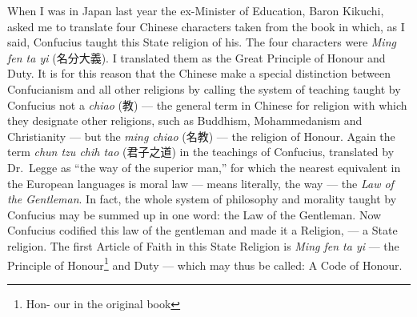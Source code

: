 When I was in Japan last year the ex-Minister of Education, Baron Kikuchi,  asked me to translate four Chinese characters taken from the book in which, as I said, Confucius taught this State religion of his.
The four characters were \emph{Ming fen ta yi} (名分大義).
I translated them as the Great Principle of Honour and Duty.
It is for this reason that the Chinese make a special distinction between Confucianism and all other religions by calling the system of teaching taught by Confucius not a \emph{chiao} (教) --- the general term in Chinese for religion with which they designate other religions, such as Buddhism, Mohammedanism and Christianity --- but the \emph{ming chiao} (名教)  --- the religion of Honour.
Again the term \emph{chun tzu chih tao} (君子之道) in the teachings of Confucius, translated by Dr.~Legge as ``the way of the superior man,'' for which the nearest equivalent in the European languages is moral law --- means literally, the way --- the {\em{Law of the Gentleman}}.
In fact, the whole system of philosophy and morality taught by Confucius may be summed up in one word: the Law of the Gentleman.
Now Confucius codified this law of the gentleman and made it a Religion, --- a State religion.
The first Article of Faith in this State Religion is \emph{Ming fen ta yi} --- the Principle of Honour\footnote{Hon- our in the original book} and Duty --- which may thus be called: A Code of Honour.

